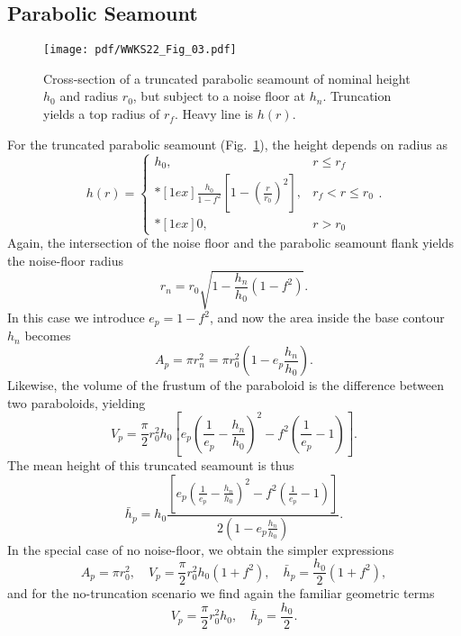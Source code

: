 \subsection{Parabolic Seamount}

\begin{figure}
\centering
\texttt{[image: pdf/WWKS22\_Fig\_03.pdf]}
\caption{Cross-section of a truncated parabolic seamount of nominal height $h_0$ and radius $r_0$, but
subject to a noise floor at $h_n$.  Truncation yields a top radius of $r_f$. Heavy line is $h(r)$.}
\label{WWKS22_Fig_03}
\end{figure}
For the truncated parabolic seamount (Fig.~\ref{WWKS22_Fig_03}), the height depends on radius as
\begin{equation*}
h(r) = \left \{ \begin{array}{cl}
	h_0, &	r \leq r_f \\*[1ex]
	\displaystyle \frac{h_0}{1-f^2} \left [1 - \left (\frac{r}{r_0} \right )^2 \right ], & r_f < r \leq r_0 \\*[1ex]
	0, & r > r_0
\end{array} \right..
\end{equation*}
Again, the intersection of the noise floor and the parabolic seamount flank yields the noise-floor
radius
\begin{equation*}
r_n = r_0 \sqrt{1 - \frac{h_n}{h_0}\left (1 - f^2 \right )}.
\end{equation*}
In this case we introduce $e_p = 1 - f^2$, and now the area inside the base contour $h_n$ becomes
\begin{equation}
A_p = \pi r_n^2 = \pi r_0^2 \left ( 1 - e_p \frac{h_n}{h_0} \right ).
\end{equation}
Likewise, the volume of the frustum of the paraboloid is the difference between two paraboloids, yielding
\begin{equation}
V_p = \frac{\pi}{2}r_0^2h_0 \left [ e_p \left (\frac{1}{e_p} - \frac{h_n}{h_0} \right )^2 - f^2 \left (\frac{1}{e_p} - 1 \right ) \right ].
\end{equation}
The mean height of this truncated seamount is thus
\begin{equation}
\bar{h}_p =  h_0 \frac{ \left [ e_p \left ( \frac{1}{e_p} - \frac{h_n}{h_0} \right )^2 -  f^2 \left (\frac{1}{e_p} - 1 \right ) \right ]}{2 \left ( 1 - e_p \frac{h_n}{h_0} \right )}.
\end{equation}
In the special case of no noise-floor, we obtain the simpler expressions
\begin{equation*}
A_p = \pi r_0^2,	\quad V_p = \frac{\pi}{2} r_0^2 h_0 \left (1 + f^2 \right ), \quad \bar{h}_p =  \frac{h_0}{2}\left (1 + f^2 \right ),
\end{equation*}
and for the no-truncation scenario we find again the familiar geometric terms
\begin{equation*}
V_p = \frac{\pi}{2}r_0^2h_0, \quad \bar{h}_p =  \frac{h_0}{2}.
\end{equation*}

